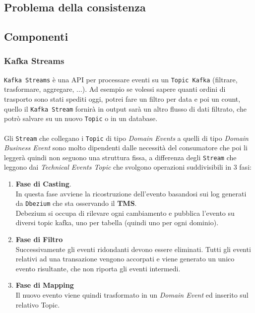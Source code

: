 \subsection{Problema della consistenza}

\subsection{Componenti}
\label{subsec:components}

\subsubsection{Kafka Streams}
\label{subsubsec:kafka_stream}
\texttt{Kafka Streams} è una API per processare eventi su un \texttt{Topic Kafka} (filtrare, trasformare, aggregare, ...).
Ad esempio se volessi sapere quanti ordini di trasporto sono stati spediti oggi, potrei fare un filtro per data e poi un count, quello il \texttt{Kafka Stream} fornirà in output sarà un altro flusso di dati filtrato, che potrò salvare su un nuovo \texttt{Topic} o in un database.\\
\\
Gli \texttt{Stream} che collegano i \texttt{Topic} di tipo \textit{Domain Events} a quelli di tipo \textit{Domain Business Event} sono molto dipendenti dalle necessità del consumatore che poi li leggerà quindi non seguono una struttura fissa, a differenza degli \texttt{Stream} che leggono dai \textit{Technical Events Topic} che svolgono operazioni suddivisibili in 3 fasi:
\begin{enumerate}
    \item \textbf{Fase di Casting}.\\
    In questa fase avviene la ricostruzione dell'evento basandosi sui log generati da \texttt{Dbezium} che sta osservando il \textbf{TMS}.\\
    Debezium si occupa di rilevare ogni cambiamento e pubblica l'evento su diversi topic kafka, uno per tabella (quindi uno per ogni dominio). 
    \item \textbf{Fase di Filtro}\\
    Successivamente gli eventi ridondanti devono essere eliminati. Tutti gli eventi relativi ad una transazione vengono accorpati e viene generato un unico evento risultante, che non riporta gli eventi intermedi. 
    \item \textbf{Fase di Mapping}\\
    Il nuovo evento viene quindi trasformato in un \textit{Domain Event} ed inserito sul relativo Topic.
\end{enumerate}

